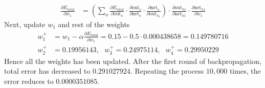 \begin{example}
\begin{align}
\frac{\partial E_{\text{total}}}{\partial w_1} &= \left( \sum_o \frac{\partial E_{\text{total}}}{\partial \text{out}_{o}} \cdot \frac{\partial \text{out}_{o}}{\partial \text{net}_{o}} \cdot \frac{\partial \text{net}_{o}}{\partial \text{out}_{h_1}}  \right) \cdot \frac{\partial \text{out}_{h1}}{\partial \text{net}_{h1}} \cdot \frac{\partial \text{net}_{h1}}{\partial w_1} \nonumber
\end{align}
Next, update $w_1$ and rest of the weights
\begin{align}
w_1^+ &= w_1 - \alpha \frac{\partial E_{\text{total}}}{\partial w_1} = 0.15 - 0.5 \cdot 0.000438658 = 0.149780716 \nonumber \\
w_2^+ &= 0.19956143 , \ \ \ w_3^+ = 0.24975114 , \ \ \ w_4^+ = 0.29950229 \nonumber
\end{align}
Hence all the weights has been updated. After the first round of backpropagation, total error has decreased to $0.291027924$. Repeating the process $10,000$ times, the error reduces to $0.0000351085$.
\end{example}
